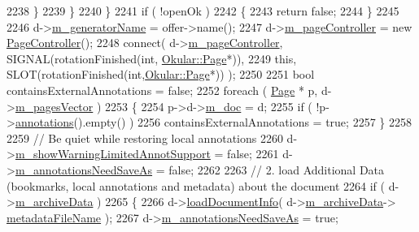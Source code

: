 \begin{DoxyCode}
2238             \}
2239         \}
2240     \}
2241     \textcolor{keywordflow}{if} ( !openOk )
2242     \{
2243         \textcolor{keywordflow}{return} \textcolor{keyword}{false};
2244     \}
2245 
2246     d->\hyperlink{classOkular_1_1DocumentPrivate_a4f02c151d836f43f47a6eeb614b25bf0}{m\_generatorName} = offer->name();
2247     d->\hyperlink{classOkular_1_1DocumentPrivate_a0764e01a78ed52ece9229f50300522f1}{m\_pageController} = \textcolor{keyword}{new} \hyperlink{classOkular_1_1PageController}{PageController}();
2248     connect( d->\hyperlink{classOkular_1_1DocumentPrivate_a0764e01a78ed52ece9229f50300522f1}{m\_pageController}, SIGNAL(rotationFinished(\textcolor{keywordtype}{int},
      \hyperlink{classOkular_1_1Page}{Okular::Page}*)),
2249              \textcolor{keyword}{this}, SLOT(rotationFinished(\textcolor{keywordtype}{int},\hyperlink{classOkular_1_1Page}{Okular::Page}*)) );
2250 
2251     \textcolor{keywordtype}{bool} containsExternalAnnotations = \textcolor{keyword}{false};
2252     \textcolor{keywordflow}{foreach} ( \hyperlink{classOkular_1_1Page}{Page} * p, d->\hyperlink{classOkular_1_1DocumentPrivate_a73b852d9a73ffe8061b66dbf9b290f17}{m\_pagesVector} )
2253     \{
2254         p->d->\hyperlink{classOkular_1_1PagePrivate_ab08c9b47d5e631b19dd2d5c85360d351}{m\_doc} = d;
2255         \textcolor{keywordflow}{if} ( !p->\hyperlink{classOkular_1_1Page_ad82e0f26d5435b5ccfa3d23c359ac23c}{annotations}().empty() )
2256             containsExternalAnnotations = \textcolor{keyword}{true};
2257     \}
2258 
2259     \textcolor{comment}{// Be quiet while restoring local annotations}
2260     d->\hyperlink{classOkular_1_1DocumentPrivate_a1d12aaa9b1f2726a8e19b416587062c9}{m\_showWarningLimitedAnnotSupport} = \textcolor{keyword}{false};
2261     d->\hyperlink{classOkular_1_1DocumentPrivate_a44f722aa34fee888929abd92fe54ad82}{m\_annotationsNeedSaveAs} = \textcolor{keyword}{false};
2262 
2263     \textcolor{comment}{// 2. load Additional Data (bookmarks, local annotations and metadata) about the document}
2264     \textcolor{keywordflow}{if} ( d->\hyperlink{classOkular_1_1DocumentPrivate_a135bb6fa2886b0eb86e9a1b72fd8d25b}{m\_archiveData} )
2265     \{
2266         d->\hyperlink{classOkular_1_1DocumentPrivate_ab3b82ad8d5fbe55c02af3b21a9e2459e}{loadDocumentInfo}( d->\hyperlink{classOkular_1_1DocumentPrivate_a135bb6fa2886b0eb86e9a1b72fd8d25b}{m\_archiveData}->
      \hyperlink{structArchiveData_aed05c74b518d7f05506d14c32cc46846}{metadataFileName} );
2267         d->\hyperlink{classOkular_1_1DocumentPrivate_a44f722aa34fee888929abd92fe54ad82}{m\_annotationsNeedSaveAs} = \textcolor{keyword}{true};

\end{DoxyCode}

